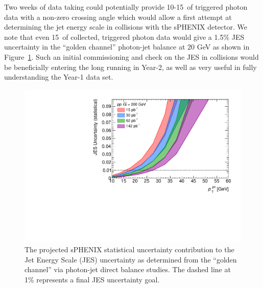 Two weeks of data taking could potentially provide 10-15~\pb of triggered photon
\pp data with a non-zero crossing angle which would allow a first attempt 
at determining the jet energy scale in \pp collisions with the sPHENIX detector.
We note that even 15~\pb of collected, triggered photon data would give a 1.5\%
JES uncertainty in the ``golden channel'' photon-jet balance at 20 GeV as shown in Figure~\ref{fig:jes}.   Such an initial commissioning and check on the JES in \pp collisions would be beneficially entering the long \pp running in Year-2, as well as very useful in fully understanding the Year-1 \auau data set.

\begin{figure}
    \centering
    \includegraphics[width=0.8\linewidth]{figs/CompareSqrtsBUR.pdf}
    \caption{The projected sPHENIX statistical uncertainty contribution to the Jet Energy Scale (JES) uncertainty as determined from the ``golden channel'' via photon-jet direct balance studies.  The dashed line at 1\% represents a final JES uncertainty goal.}
    \label{fig:jes}
\end{figure}

